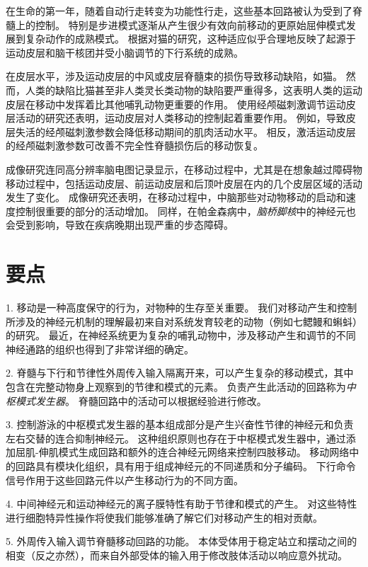 在生命的第一年，随着自动行走转变为功能性行走，这些基本回路被认为受到了脊髓上的控制。
特别是步进模式逐渐从产生很少有效向前移动的更原始屈伸模式发展到复杂动作的成熟模式。
根据对猫的研究，这种适应似乎合理地反映了起源于运动皮层和脑干核团并受小脑调节的下行系统的成熟。


在皮层水平，涉及运动皮层的中风或皮层脊髓束的损伤导致移动缺陷，如猫。
然而，人类的缺陷比猫甚至非人类灵长类动物的缺陷要严重得多，这表明人类的运动皮层在移动中发挥着比其他哺乳动物更重要的作用。
使用经颅磁刺激调节运动皮层活动的研究还表明，运动皮层对人类移动的控制起着重要作用。
例如，导致皮层失活的经颅磁刺激参数会降低移动期间的肌肉活动水平。
相反，激活运动皮层的经颅磁刺激参数可改善不完全性脊髓损伤后的移动恢复。


成像研究连同高分辨率脑电图记录显示，在移动过程中，尤其是在想象越过障碍物移动过程中，包括运动皮层、前运动皮层和后顶叶皮层在内的几个皮层区域的活动发生了变化。
成像研究还表明，在移动过程中，中脑那些对动物移动的启动和速度控制很重要的部分的活动增加。
同样，在帕金森病中，\textit{脑桥脚核}中的神经元也会受到影响，导致在疾病晚期出现严重的步态障碍。



\section{要点}

1. 移动是一种高度保守的行为，对物种的生存至关重要。
我们对移动产生和控制所涉及的神经元机制的理解最初来自对系统发育较老的动物（例如七鳃鳗和蝌蚪）的研究。
最近，在神经系统更为复杂的哺乳动物中，涉及移动产生和调节的不同神经通路的组织也得到了非常详细的确定。 


2. 脊髓与下行和节律性外周传入输入隔离开来，可以产生复杂的移动模式，其中包含在完整动物身上观察到的节律和模式的元素。
负责产生此活动的回路称为\textit{中枢模式发生器}。
脊髓回路中的活动可以根据经验进行修改。


3. 控制游泳的中枢模式发生器的基本组成部分是产生兴奋性节律的神经元和负责左右交替的连合抑制神经元。
这种组织原则也存在于中枢模式发生器中，通过添加屈肌-伸肌模式生成回路和额外的连合神经元网络来控制四肢移动。
移动网络中的回路具有模块化组织，具有用于组成神经元的不同递质和分子编码。
下行命令信号作用于这些回路元件以产生移动行为的不同方面。


4. 中间神经元和运动神经元的离子膜特性有助于节律和模式的产生。
对这些特性进行细胞特异性操作将使我们能够准确了解它们对移动产生的相对贡献。


5. 外周传入输入调节脊髓移动回路的功能。
本体受体用于稳定站立和摆动之间的相变（反之亦然），而来自外部受体的输入用于修改肢体活动以响应意外扰动。 


